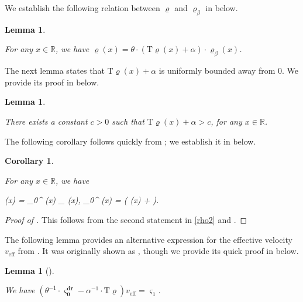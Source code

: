 \documentclass{amsart}
\numberwithin{equation}{section}
\DeclareMathOperator{\dr}{dr}
\DeclareMathOperator{\eff}{eff}
\newtheorem{lem}[thm]{Lemma}
\newtheorem{cor}[thm]{Corollary}
\theoremstyle{remark}
\theoremstyle{definition}
\begin{document}
	We establish the following relation between $\varrho$ and $\varrho_{\beta}$ in  below.

	\begin{lem}
		\label{rhorho} 
		
		For any $x \in \mathbb{R}$, we have $\varrho(x) = \theta \cdot ( \bm{\mathrm{T}} \varrho (x) + \alpha ) \cdot \varrho_{\beta} (x)$.
		
	\end{lem} 
	
	
	The next lemma states that $\bm{\mathrm{T}} \varrho (x) + \alpha$ is uniformly bounded away from $0$. We provide its proof in  below.
	
	\begin{lem}
		\label{alphat}
		
		There exists a constant $c > 0$ such that $\bm{\mathrm{T}} \varrho (x) + \alpha > c$, for any $x \in \mathbb{R}$.
		
	\end{lem}
	
	The following corollary follows quickly from ; we establish it in  below.
	
	\begin{cor}
		\label{rho0}
		
		For any $x \in \mathbb{R}$, we have 
		\begin{flalign} 
			\label{rho2} 
			\varrho (x) = \alpha \cdot \varsigma_0^{\dr} (x) \cdot \varrho_{\beta} (x), \qquad {} \qquad \varsigma_0^{\dr} (x) = \displaystyle\frac{\theta}{\alpha} \cdot \big(  \varrho (x) + \alpha \big).
		\end{flalign} 
		
	\end{cor}
	
	\begin{proof}[Proof of ] 
		
		This follows from the second statement in \eqref{rho2} and .
	\end{proof}
	
	The following lemma provides an alternative expression for the effective velocity $v_{\eff}$ from . It was originally shown as \cite[Equations (6.20) and (6.21)]{HSIMS}, though we provide its quick proof in  below.

	\begin{lem}[{\cite[Equations (6.20) and (6.21)]{HSIMS}}] 
		\label{vt} 
		
		We have $(  \theta^{-1} \cdot \bm{\varsigma_0^{\dr}} - \alpha^{-1} \cdot \bm{\mathrm{T}} \bm{\varrho}) v_{\eff} = \varsigma_1$.
	
	\end{lem} 
	
\end{document}
